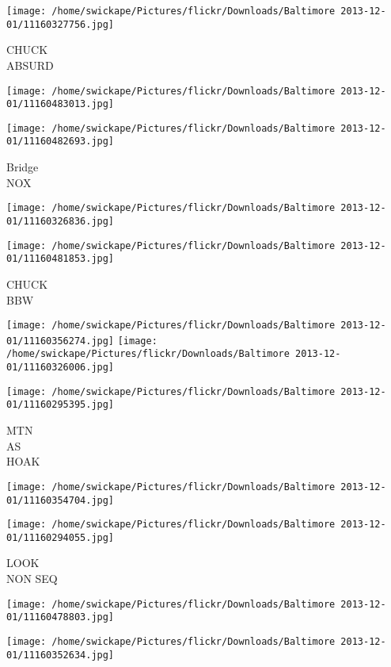 \documentclass[10pt,letterpaper]{article}
\begin{document}
\vspace{0.25in}
\texttt{[image: /home/swickape/Pictures/flickr/Downloads/Baltimore 2013-12-01/11160327756.jpg]}

CHUCK\\
ABSURD
\pagebreak

\texttt{[image: /home/swickape/Pictures/flickr/Downloads/Baltimore 2013-12-01/11160483013.jpg]}

\vspace{0.25in}
\texttt{[image: /home/swickape/Pictures/flickr/Downloads/Baltimore 2013-12-01/11160482693.jpg]}

Bridge\\
NOX
\pagebreak

\texttt{[image: /home/swickape/Pictures/flickr/Downloads/Baltimore 2013-12-01/11160326836.jpg]}

\vspace{0.25in}
\texttt{[image: /home/swickape/Pictures/flickr/Downloads/Baltimore 2013-12-01/11160481853.jpg]}

CHUCK\\
BBW
\pagebreak

\texttt{[image: /home/swickape/Pictures/flickr/Downloads/Baltimore 2013-12-01/11160356274.jpg]}
\texttt{[image: /home/swickape/Pictures/flickr/Downloads/Baltimore 2013-12-01/11160326006.jpg]}

\texttt{[image: /home/swickape/Pictures/flickr/Downloads/Baltimore 2013-12-01/11160295395.jpg]}

MTN\\
AS\\
HOAK
\pagebreak

\texttt{[image: /home/swickape/Pictures/flickr/Downloads/Baltimore 2013-12-01/11160354704.jpg]}

\vspace{0.25in}
\texttt{[image: /home/swickape/Pictures/flickr/Downloads/Baltimore 2013-12-01/11160294055.jpg]}

LOOK\\
NON SEQ
\pagebreak

\texttt{[image: /home/swickape/Pictures/flickr/Downloads/Baltimore 2013-12-01/11160478803.jpg]}

\vspace{0.25in}
\texttt{[image: /home/swickape/Pictures/flickr/Downloads/Baltimore 2013-12-01/11160352634.jpg]}
\end{document}
